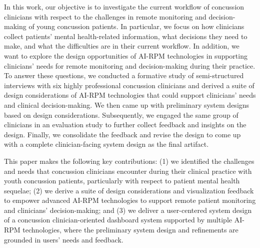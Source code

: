  
In this work, our objective is to investigate the current workflow of concussion clinicians with respect to the challenges in remote monitoring and decision-making of young concussion patients.
In particular, we focus on how clinicians collect patients' mental health-related information, what decisions they need to make, and what the difficulties are in their current workflow.
In addition, we want to explore the design opportunities of AI-RPM technologies in supporting clinicians' needs for remote monitoring and decision-making during their practice.
To answer these questions, we conducted a formative study of semi-structured interviews with six highly professional concussion clinicians and derived a suite of design considerations of AI-RPM technologies that could support clinicians' needs and clinical decision-making.
We then came up with preliminary system designs based on design considerations.
Subsequently, we engaged the same group of clinicians in an evaluation study to further collect feedback and insights on the design.
Finally, we consolidate the feedback and revise the design to come up with a complete clinician-facing system design as the final artifact. 

This paper makes the following key contributions:
(1) we identified the challenges and needs that concussion clinicians encounter during their clinical practice with youth concussion patients, particularly with respect to patient mental health sequelae; 
(2) we derive a suite of design considerations and visualization feedback to empower advanced AI-RPM technologies to support remote patient monitoring and clinicians' decision-making; and 
(3) we deliver a user-centered system design of a concussion clinician-oriented dashboard system supported by multiple AI-RPM technologies, where the preliminary system design and refinements are grounded in users' needs and feedback.

